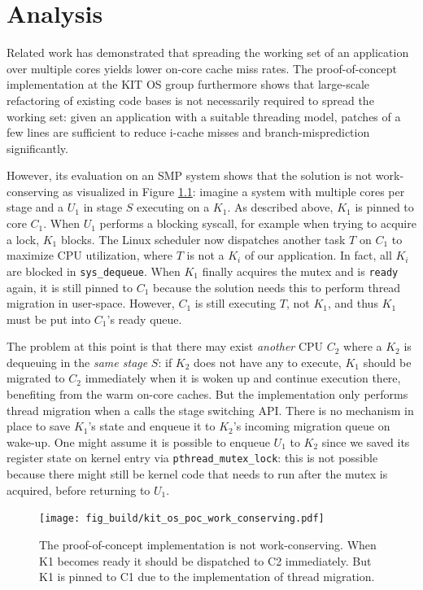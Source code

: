 \documentclass[12pt,a4paper]{book}
\begin{document}
\chapter{Analysis}\label{ch:analysis}
Related work has demonstrated that spreading the working set of an application over multiple cores yields lower on-core cache miss rates.
The proof-of-concept implementation at the KIT OS group furthermore shows that large-scale refactoring of existing code bases is not necessarily required to spread the working set:
given an application with a suitable threading model, patches of a few lines are sufficient to reduce i-cache misses and branch-misprediction significantly.

However, its evaluation on an SMP system shows that the solution is not work-conserving as visualized in Figure \ref{fig:kit_os_poc_work_conserving}:
imagine a system with multiple cores per stage and a \ult $U_1$ in stage $S$ executing on a \klt $K_1$.
As described above, $K_1$ is pinned to core $C_1$.
When $U_1$ performs a blocking syscall, for example when trying to acquire a lock, $K_1$ blocks.
The Linux scheduler now dispatches another task $T$ on $C_1$ to maximize CPU utilization, where $T$ is not a $K_i$ of our application.
In fact, all $K_i$ are blocked in \texttt{sys\_dequeue}.
When $K_1$ finally acquires the mutex and is \texttt{ready} again, it is still pinned to $C_1$ because the solution needs this to perform thread migration in user-space.
However, $C_1$ is still executing $T$, not $K_1$, and thus $K_1$ must be put into $C_1$'s ready queue.

The problem at this point is that there may exist \emph{another} CPU $C_2$ where a \klt $K_2$ is dequeuing \ults in the \emph{same stage} $S$:
if $K_2$ does not have any \ults to execute, $K_1$ should be migrated to $C_2$ immediately when it is woken up and continue execution there, benefiting from the warm on-core caches.
But the implementation only performs thread migration when a \ult calls the stage switching API.
There is no mechanism in place to save $K_1$'s state and enqueue it to $K_2$'s incoming migration queue on wake-up.
One might assume it is possible to enqueue $U_1$ to $K_2$ since we saved its register state on kernel entry via \texttt{pthread\_mutex\_lock}:
this is not possible because there might still be kernel code that needs to run after the mutex is acquired, before returning to $U_1$.

\begin{figure}[h]
    \centering
    \texttt{[image: fig\_build/kit\_os\_poc\_work\_conserving.pdf]}
    \caption{The proof-of-concept implementation is not work-conserving. When K1 becomes ready it should be dispatched to C2 immediately. But K1 is pinned to C1 due to the implementation of thread migration.}
    \label{fig:kit_os_poc_work_conserving}
\end{figure}
\end{document}
